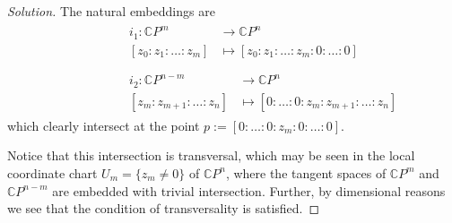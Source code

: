 \begin{proof}[Solution]\leavevmode
The natural embeddings are
\begin{align*}
&\begin{aligned}i_1: \mathbb{C}P^m &\longrightarrow \mathbb{C}P^n \\
	[z_0:z_1:\ldots:z_m] &\longmapsto [z_0:z_1:\ldots:z_m:0:\ldots:0]
\end{aligned}
\\\\\qquad \qquad & \begin{aligned}	i_2: \mathbb{C}P^{n-m} &\longrightarrow \mathbb{C}P^n \\
[z_{m}:z_{m+1}:\ldots:z_n] &\longmapsto [0:\ldots:0:z_{m}:z_{m+1}:\ldots:z_n] \end{aligned}\end{align*}
which clearly intersect at the point \(p:=[0:\ldots:0:z_m:0:\ldots:0]\).

Notice that this intersection is transversal, which may be seen in the local coordinate chart \(U_m=\{z_m\neq 0\}\) of \(\mathbb{C}P^{n}\), where the tangent spaces of \(\mathbb{C}P^{m}\) and \(\mathbb{C}P^{n-m}\) are embedded with trivial intersection. Further, by dimensional reasons we see that the condition of transversality is satisfied.


\end{proof}
